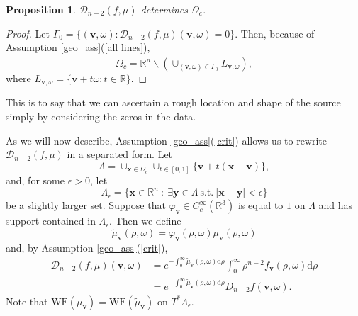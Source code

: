 \documentclass[a4paper,12pt]{amsart}
\numberwithin{equation}{section}
\theoremstyle{plain}
\numberwithin{theorem}{section}
\newtheorem{proposition}[theorem]{Proposition}
\theoremstyle{definition}
\theoremstyle{remark}
\theoremstyle{remark}
\theoremstyle{remark}
\newcommand{\paren}[1]{\left(#1\right)}               %
\newcommand{\WF}{\mathrm{WF}}
\newcommand{\vv}{{\mathbf{v}}}
\newcommand{\vx}{{\mathbf{x}}}
\newcommand{\vy}{{\mathbf{y}}}
\newcommand{\seanc}[1]{\begin{quotation}\textbf{Sean's comment:\
}{\textit{#1}}\end{quotation}}
\begin{document}
\begin{proposition}\label{prop_hull}
$\mathcal{D}_{n-2}(f,\mu)$ determines $\Omega_c$.
\end{proposition}
\begin{proof}
Let $\Gamma_0 = \{(\vv,\omega) : \mathcal{D}_{n-2}(f,\mu)(\vv,\omega) = 0\}$. Then, because of Assumption \ref{geo_ass}(\ref{all lines}),
\begin{equation}
\label{equ_hull}
\Omega_c = \overline{\mathbb{R}^n \backslash \paren{ \cup_{(\vv,\omega) \in \Gamma_0} L_{\vv,\omega} }},
\end{equation}
where $L_{\vv,\omega} = \{\vv +t\omega : t\in \mathbb{R}\}$.
\end{proof}

This is to say that we can ascertain a rough location and shape of the source simply by considering the zeros in the data.%


As we will now describe, Assumption \ref{geo_ass}(\ref{crit}) allows us to rewrite $\mathcal{D}_{n-2}(f,\mu)$ in a separated form. Let
$$\Lambda = \cup_{\vx \in \Omega_c} \cup_{t\in [0,1]} \{\vv + t(\vx - \vv)\},$$
and, for some $\epsilon > 0$, let
\[
\Lambda_{\epsilon} = \{ \vx \in \mathbb{R}^n \ : \  \exists \vy \in \Lambda\ \text{s.t.}\ |\vx - \vy| < \epsilon\}
\]
be a slightly larger set. Suppose that $\varphi_{\vv} \in C_{c}^\infty(\mathbb{R}^3)$ is equal to $1$ on $\Lambda$ and has support contained in $\Lambda_{\epsilon}$. Then we define
\[
\tilde{\mu}_\vv(\rho,\omega) = \varphi_\vv(\rho,\omega) \mu_\vv(\rho,\omega)
\]
and, by Assumption \ref{geo_ass}(\ref{crit}),
\begin{equation}\label{prod_data}
\begin{split}
\mathcal{D}_{n-2}(f,\mu)(\vv,\omega) &= e^{ -\int_0^\infty \tilde{\mu}_\vv(\rho,\omega)\mathrm{d}\rho }  \int_0^\infty \rho^{n-2} f_\vv(\rho,\omega) \mathrm{d}\rho \\
&= e^{ -\int_0^\infty \tilde{\mu}_\vv(\rho,\omega)\mathrm{d}\rho }  D_{n-2}f(\vv,\omega).
\end{split}
\end{equation}
Note that $\WF(\mu_\vv) = \WF(\tilde{\mu}_\vv)$ on $T^*\Lambda_\epsilon$. 
\end{document}
